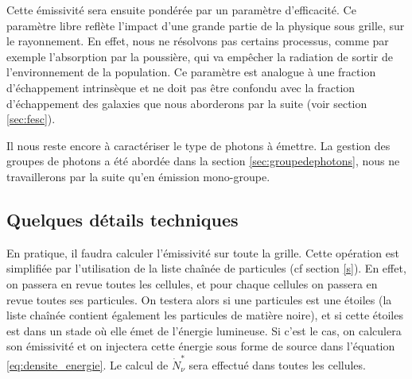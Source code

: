 Cette émissivité sera ensuite pondérée par un paramètre d'efficacité.
Ce paramètre libre reflète l'impact d'une grande partie de la physique sous grille, sur le rayonnement.
En effet, nous ne résolvons pas certains processus, comme par exemple l'absorption par la poussière, qui va empêcher la radiation de sortir de l’environnement de la population.
Ce paramètre est analogue à une fraction d'échappement intrinsèque et ne doit pas être confondu avec la fraction d'échappement des galaxies que nous aborderons par la suite (voir section \ref{sec:fesc}).

Il nous reste encore à caractériser le type de photons à émettre.
La gestion des groupes de photons a été abordée dans la section \ref{sec:groupedephotons}, nous ne travaillerons par la suite qu'en émission mono-groupe.



\subsection{Quelques détails techniques}

En pratique, il faudra calculer l'émissivité sur toute la grille.
Cette opération est simplifiée par l'utilisation de la liste chaînée de particules (cf section \ref{s}).
En effet, on passera en revue toutes les cellules, et pour chaque cellules on passera en revue toutes ses particules.
On testera alors si une particules est une étoiles (la liste chaînée contient également les particules de matière noire), et si cette étoiles est dans un stade où elle émet de l'énergie lumineuse.
Si c'est le cas, on calculera son émissivité et on injectera cette énergie sous forme de source dans l'équation \ref{eq:densite_energie}.
Le calcul de $\dot{N}_\nu^*$ sera effectué dans toutes les cellules.


